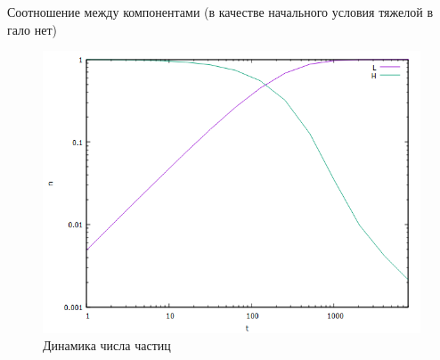 Соотношение между компонентами (в качестве начального условия тяжелой в гало нет)
\begin{figure}
	\includegraphics[width=0.7\linewidth]{images/evolution.png}
	\caption{Динамика числа частиц}
\end{figure}